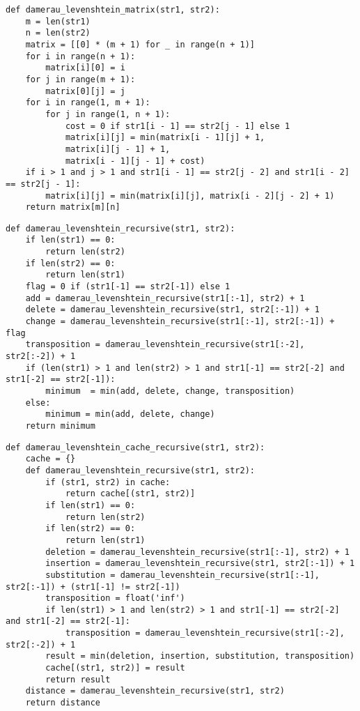 \begin{center}
    \captionsetup{justification=raggedright,singlelinecheck=off}
    \begin{lstlisting}[label=lst:lev_mat,caption=Алгоритм нахождения расстояния Дамерау-Левенштейна]
def damerau_levenshtein_matrix(str1, str2):
	m = len(str1)
	n = len(str2)
	matrix = [[0] * (m + 1) for _ in range(n + 1)]
	for i in range(n + 1):
		matrix[i][0] = i
	for j in range(m + 1):
		matrix[0][j] = j
	for i in range(1, m + 1):
		for j in range(1, n + 1):
			cost = 0 if str1[i - 1] == str2[j - 1] else 1
			matrix[i][j] = min(matrix[i - 1][j] + 1,         
			matrix[i][j - 1] + 1,        
			matrix[i - 1][j - 1] + cost) 
	if i > 1 and j > 1 and str1[i - 1] == str2[j - 2] and str1[i - 2] == str2[j - 1]:
		matrix[i][j] = min(matrix[i][j], matrix[i - 2][j - 2] + 1)
	return matrix[m][n]
\end{lstlisting}
\clearpage
    \captionsetup{justification=raggedright,singlelinecheck=off}
    \begin{lstlisting}[label=lst:lev_cach,caption=Рекурсивный алгоритм нахождения расстояния Дамерау-Левенштейна]
def damerau_levenshtein_recursive(str1, str2):
	if len(str1) == 0:
		return len(str2)
	if len(str2) == 0:
		return len(str1)
	flag = 0 if (str1[-1] == str2[-1]) else 1
	add = damerau_levenshtein_recursive(str1[:-1], str2) + 1
	delete = damerau_levenshtein_recursive(str1, str2[:-1]) + 1
	change = damerau_levenshtein_recursive(str1[:-1], str2[:-1]) + flag
	transposition = damerau_levenshtein_recursive(str1[:-2], str2[:-2]) + 1
	if (len(str1) > 1 and len(str2) > 1 and str1[-1] == str2[-2] and str1[-2] == str2[-1]):
		minimum  = min(add, delete, change, transposition)
	else:
		minimum = min(add, delete, change)
	return minimum
\end{lstlisting}
\end{center}
\clearpage

\begin{center}
    \captionsetup{justification=raggedright,singlelinecheck=off}
    \begin{lstlisting}[label=lst:dam_lev_rec,caption=Рекурсивный алгоритм нахождения расстояния Дамерау-Левенштейна с использованием кеша]
def damerau_levenshtein_cache_recursive(str1, str2):
	cache = {}
	def damerau_levenshtein_recursive(str1, str2):
		if (str1, str2) in cache:
			return cache[(str1, str2)]
		if len(str1) == 0:
			return len(str2)
		if len(str2) == 0:
			return len(str1)
		deletion = damerau_levenshtein_recursive(str1[:-1], str2) + 1
		insertion = damerau_levenshtein_recursive(str1, str2[:-1]) + 1
		substitution = damerau_levenshtein_recursive(str1[:-1], str2[:-1]) + (str1[-1] != str2[-1])
		transposition = float('inf')
		if len(str1) > 1 and len(str2) > 1 and str1[-1] == str2[-2] and str1[-2] == str2[-1]:
			transposition = damerau_levenshtein_recursive(str1[:-2], str2[:-2]) + 1
		result = min(deletion, insertion, substitution, transposition)
		cache[(str1, str2)] = result
		return result
	distance = damerau_levenshtein_recursive(str1, str2)
	return distance
\end{lstlisting}
\end{center}

